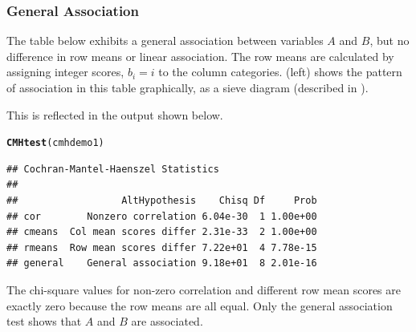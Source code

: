 \documentclass[11pt]{book}\usepackage[]{graphicx}\usepackage[]{color}
\makeatletter
\newcommand{\hlstd}[1]{\textcolor[rgb]{0.345,0.345,0.345}{#1}}%
\newcommand{\hlkwd}[1]{\textcolor[rgb]{0.737,0.353,0.396}{\textbf{#1}}}%
\newenvironment{kframe}{%
 \def\at@end@of@kframe{}%
 \ifinner\ifhmode%
  \def\at@end@of@kframe{\end{minipage}}%
  \begin{minipage}{\columnwidth}%
 \fi\fi%
 \def\FrameCommand##1{\hskip\@totalleftmargin \hskip-\fboxsep
 \colorbox{shadecolor}{##1}\hskip-\fboxsep
     \hskip-\linewidth \hskip-\@totalleftmargin \hskip\columnwidth}%
 \MakeFramed {\advance\hsize-\width
   \@totalleftmargin\z@ \linewidth\hsize
   \@setminipage}}%
 {\par\unskip\endMakeFramed%
 \at@end@of@kframe}
\newenvironment{knitrout}{}{} %
\renewenvironment{knitrout}{\small\renewcommand{\baselinestretch}{.85}}{} %
\makeatother
\begin{document}
\subsubsection{General Association}
The table below exhibits a
general association between variables $A$ and $B$, but no difference in
row means or linear association.  The row means are calculated by
assigning integer scores, $b_i = i$ to the column categories.
(left) shows
the pattern of association in this table graphically, as a sieve diagram
(described in ).





This is reflected in the  output shown below.
\begin{knitrout}
\color{fgcolor}\begin{kframe}
\begin{alltt}
\hlkwd{CMHtest}\hlstd{(cmhdemo1)}
\end{alltt}
\begin{verbatim}
## Cochran-Mantel-Haenszel Statistics 
## 
##                  AltHypothesis    Chisq Df     Prob
## cor        Nonzero correlation 6.04e-30  1 1.00e+00
## cmeans  Col mean scores differ 2.31e-33  2 1.00e+00
## rmeans  Row mean scores differ 7.22e+01  4 7.78e-15
## general    General association 9.18e+01  8 2.01e-16
\end{verbatim}
\end{kframe}
\end{knitrout}


The chi-square values for non-zero correlation and different
row mean scores are exactly zero because the row means are all equal.
Only the general association test shows that $A$ and $B$
are associated.
\end{document}
